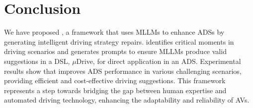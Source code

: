 \section{Conclusion}
\label{sec:conclusion}
We have proposed \coolname, a framework that uses MLLMs to enhance ADSs by generating intelligent driving strategy repairs. \coolname identifies critical moments in driving scenarios and generates prompts to ensure MLLMs produce valid suggestions in a DSL, $\mu$Drive, for direct application in an ADS.
Experimental results show that \coolname improves ADS performance in various challenging scenarios, providing efficient and cost-effective driving suggestions. 
This framework represents a step towards bridging the gap between human expertise and automated driving technology, enhancing the adaptability and reliability of AVs. 